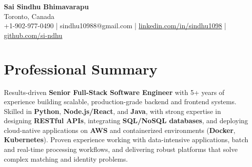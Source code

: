 \documentclass[letterpaper,11pt]{article}
\begin{document}
\begin{center}
  {\Large \textbf{Sai Sindhu Bhimavarapu}} \\
  Toronto, Canada \\
  +1-902-977-0490 \enspace | \enspace sindhu10988@gmail.com \enspace | \enspace \href{https://www.linkedin.com/in/sindhu1098/}{linkedin.com/in/sindhu1098} \enspace | \enspace \href{https://github.com/si-ndhu}{github.com/si-ndhu}
\end{center}

\section{Professional Summary}
  \begin{itemize}[leftmargin=0.15in, label={}]
    \small{\item{
     Results-driven \textbf{Senior Full-Stack Software Engineer} with 5+ years of experience building scalable, production-grade backend and frontend systems. Skilled in \textbf{Python}, \textbf{Node.js/React}, and \textbf{Java}, with strong expertise in designing \textbf{RESTful APIs}, integrating \textbf{SQL/NoSQL databases}, and deploying cloud-native applications on \textbf{AWS} and containerized environments (\textbf{Docker}, \textbf{Kubernetes}). Proven experience working with data-intensive applications, batch and real-time processing workflows, and delivering robust platforms that solve complex matching and identity problems.
    }}
  \end{itemize}
\vspace{-16pt}

\end{document}
